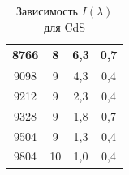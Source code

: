 \documentclass[a4paper,12pt]{report}
\begin{document}
\begin{table}[H]
\begin{center}
\begin{tabular}{|c|c|c|c|}
8766      & 8               & 6,3                         & 0,7                              \\ \hline
9098      & 9               & 4,3                         & 0,4                              \\ \hline
9212      & 9               & 2,3                         & 0,4                              \\ \hline
9328      & 9               & 1,8                         & 0,7                              \\ \hline
9504      & 9               & 1,3                         & 0,4                              \\ \hline
9804      & 10              & 1,0                         & 0,4                              \\ \hline
\end{tabular}
\end{center}
\caption{Зависимость $I(\lambda)$ для CdS}
\end{table}
\end{document}
